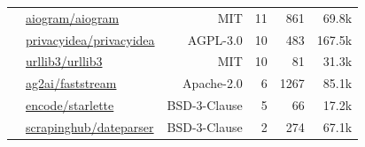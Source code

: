 {\begin{tabular}{llrrrr}
& \href{https://github.com/aiogram/aiogram}{aiogram/aiogram} & MIT & 11 & 861 & 69.8k \\
& \href{https://github.com/privacyidea/privacyidea}{privacyidea/privacyidea} & AGPL-3.0 & 10 & 483 & 167.5k \\
& \href{https://github.com/urllib3/urllib3}{urllib3/urllib3} & MIT & 10 & 81 & 31.3k \\
& \href{https://github.com/ag2ai/faststream}{ag2ai/faststream} & Apache-2.0 & 6 & 1267 & 85.1k \\
& \href{https://github.com/encode/starlette}{encode/starlette} & BSD-3-Clause & 5 & 66 & 17.2k \\
& \href{https://github.com/scrapinghub/dateparser}{scrapinghub/dateparser} & BSD-3-Clause & 2 & 274 & 67.1k \\
\bottomrule
\end{tabular}
}



